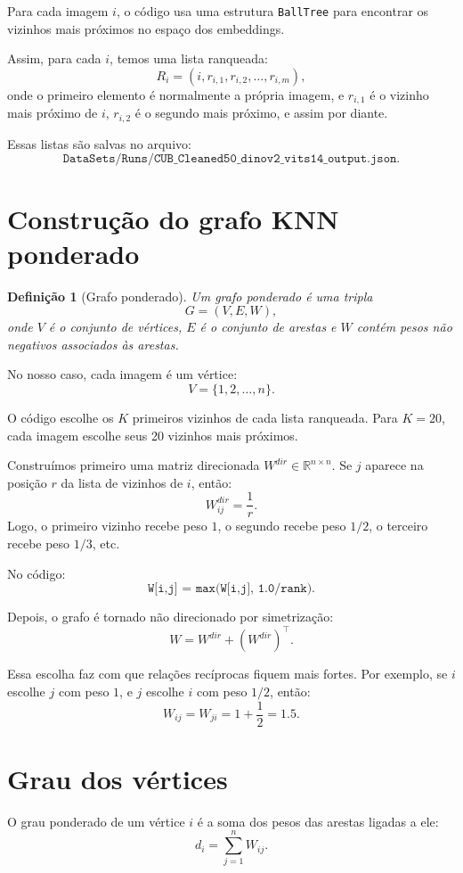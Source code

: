 \documentclass[11pt,a4paper]{article}
\newtheorem{definition}{Definição}
\begin{document}
Para cada imagem \(i\), o código usa uma estrutura \texttt{BallTree} para
encontrar os vizinhos mais próximos no espaço dos embeddings.

Assim, para cada \(i\), temos uma lista ranqueada:
\[
R_i = (i, r_{i,1}, r_{i,2}, \ldots, r_{i,m}),
\]
onde o primeiro elemento é normalmente a própria imagem, e
\(r_{i,1}\) é o vizinho mais próximo de \(i\), \(r_{i,2}\) é o segundo mais
próximo, e assim por diante.

Essas listas são salvas no arquivo:
\[
\texttt{DataSets/Runs/CUB\_Cleaned50\_dinov2\_vits14\_output.json}.
\]

\section{Construção do grafo KNN ponderado}

\begin{definition}[Grafo ponderado]
Um grafo ponderado é uma tripla
\[
G=(V,E,W),
\]
onde \(V\) é o conjunto de vértices, \(E\) é o conjunto de arestas e
\(W\) contém pesos não negativos associados às arestas.
\end{definition}

No nosso caso, cada imagem é um vértice:
\[
V=\{1,2,\ldots,n\}.
\]

O código escolhe os \(K\) primeiros vizinhos de cada lista ranqueada. Para
\(K=20\), cada imagem escolhe seus 20 vizinhos mais próximos.

Construímos primeiro uma matriz direcionada \(W^{dir}\in\mathbb{R}^{n\times n}\).
Se \(j\) aparece na posição \(r\) da lista de vizinhos de \(i\), então:
\[
W^{dir}_{ij} = \frac{1}{r}.
\]
Logo, o primeiro vizinho recebe peso \(1\), o segundo recebe peso \(1/2\), o
terceiro recebe peso \(1/3\), etc.

No código:
\[
\texttt{W[i,j] = max(W[i,j], 1.0/rank)}.
\]

Depois, o grafo é tornado não direcionado por simetrização:
\[
W = W^{dir} + (W^{dir})^\top.
\]

Essa escolha faz com que relações recíprocas fiquem mais fortes. Por exemplo,
se \(i\) escolhe \(j\) com peso \(1\), e \(j\) escolhe \(i\) com peso \(1/2\),
então:
\[
W_{ij}=W_{ji}=1+\frac{1}{2}=1.5.
\]

\section{Grau dos vértices}

O grau ponderado de um vértice \(i\) é a soma dos pesos das arestas ligadas a
ele:
\[
d_i = \sum_{j=1}^{n} W_{ij}.
\]
\end{document}
